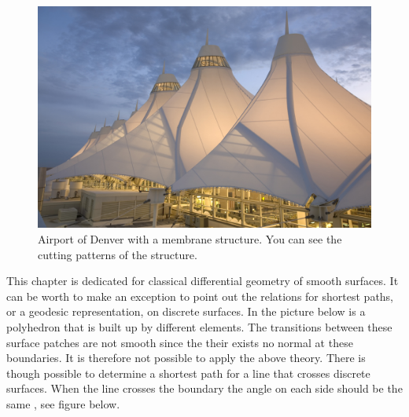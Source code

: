 \begin{figure}[H]
\centering
\includegraphics[width=0.9\linewidth ]{figure/Theory/Denver.jpg}
\caption{Airport of Denver with a membrane structure. You can see the cutting patterns of the structure. }
\end{figure}

This chapter is dedicated for classical differential geometry of smooth surfaces. It can be worth to make an exception to point out the relations for shortest paths, or a geodesic representation, on discrete surfaces. In the picture below is a polyhedron that is built up by different elements. The transitions between these surface patches are not smooth since the their exists no normal at these boundaries. It is therefore not possible to apply the above theory. There is though possible to determine a shortest path for a line that crosses discrete surfaces. When the line crosses the  boundary the angle on each side should be the same \cite{ref:ArchGeometry}, see figure below.

